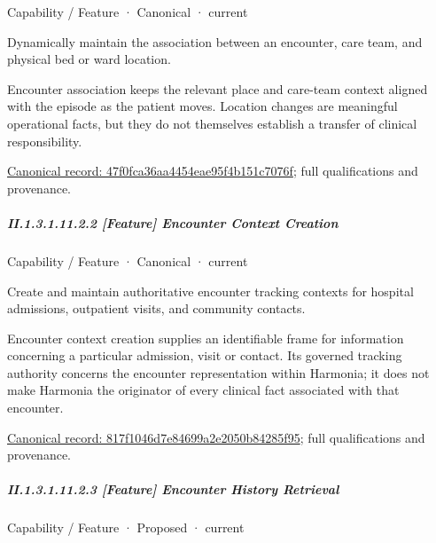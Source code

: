 \label{element:47f0fca36aa4454eae95f4b151c7076f}
{\small Capability / Feature · Canonical · current}\par

Dynamically maintain the association between an encounter, care team, and physical bed or ward location.



Encounter association keeps the relevant place and care-team context aligned with the episode as the patient moves. Location changes are meaningful operational facts, but they do not themselves establish a transfer of clinical responsibility.


{\footnotesize \href{../../../../continuum/strategy/capability/feature/47f0fca36aa4454eae95f4b151c7076f.md}{Canonical record: 47f0fca36aa4454eae95f4b151c7076f}; full qualifications and provenance.}\par
\subparagraph*{II.1.3.1.11.2.2 [Feature] Encounter Context Creation}
\label{navigation:II.1.3.1.11.2.2}

\label{element:817f1046d7e84699a2e2050b84285f95}
{\small Capability / Feature · Canonical · current}\par

Create and maintain authoritative encounter tracking contexts for hospital admissions, outpatient visits, and community contacts.



Encounter context creation supplies an identifiable frame for information concerning a particular admission, visit or contact. Its governed tracking authority concerns the encounter representation within Harmonia; it does not make Harmonia the originator of every clinical fact associated with that encounter.


{\footnotesize \href{../../../../continuum/strategy/capability/feature/817f1046d7e84699a2e2050b84285f95.md}{Canonical record: 817f1046d7e84699a2e2050b84285f95}; full qualifications and provenance.}\par
\subparagraph*{II.1.3.1.11.2.3 [Feature] Encounter History Retrieval}
\label{navigation:II.1.3.1.11.2.3}

\label{element:4088e1408f554143a0f1469efd1b43a7}
{\small Capability / Feature · Proposed · current}\par

